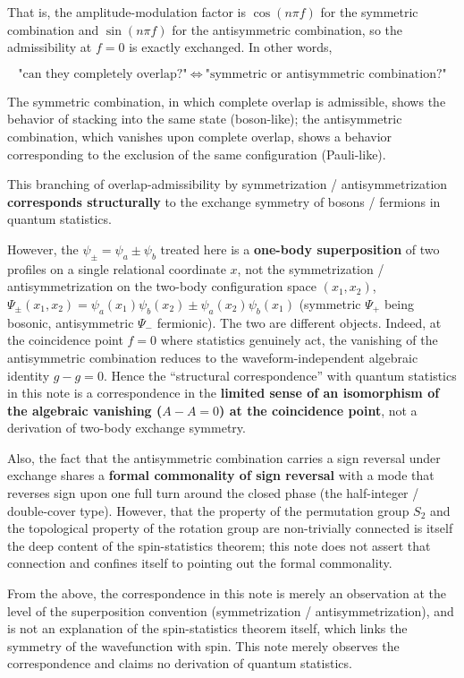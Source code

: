 \documentclass[
]{article}
\begin{document}
That is, the amplitude-modulation factor is \(\cos(n\pi f)\) for the
symmetric combination and \(\sin(n\pi f)\) for the antisymmetric
combination, so the admissibility at \(f=0\) is exactly exchanged. In
other words,

\[\text{"can they completely overlap?"}\ \Longleftrightarrow\ \text{"symmetric or antisymmetric combination?"}\]

The symmetric combination, in which complete overlap is admissible,
shows the behavior of stacking into the same state (boson-like); the
antisymmetric combination, which vanishes upon complete overlap, shows a
behavior corresponding to the exclusion of the same configuration
(Pauli-like).

This branching of overlap-admissibility by symmetrization /
antisymmetrization \textbf{corresponds structurally} to the exchange
symmetry of bosons / fermions in quantum statistics.

However, the \(\psi_\pm=\psi_a\pm\psi_b\) treated here is a
\textbf{one-body superposition} of two profiles on a single relational
coordinate \(x\), not the symmetrization / antisymmetrization on the
two-body configuration space \((x_1,x_2)\),
\(\Psi_\pm(x_1,x_2)=\psi_a(x_1)\psi_b(x_2)\pm\psi_a(x_2)\psi_b(x_1)\)
(symmetric \(\Psi_+\) being bosonic, antisymmetric \(\Psi_-\)
fermionic). The two are different objects. Indeed, at the coincidence
point \(f=0\) where statistics genuinely act, the vanishing of the
antisymmetric combination reduces to the waveform-independent algebraic
identity \(g-g=0\). Hence the ``structural correspondence'' with quantum
statistics in this note is a correspondence in the \textbf{limited sense
of an isomorphism of the algebraic vanishing (\(A-A=0\)) at the
coincidence point}, not a derivation of two-body exchange symmetry.

Also, the fact that the antisymmetric combination carries a sign
reversal under exchange shares a \textbf{formal commonality of sign
reversal} with a mode that reverses sign upon one full turn around the
closed phase (the half-integer / double-cover type). However, that the
property of the permutation group \(S_2\) and the topological property
of the rotation group are non-trivially connected is itself the deep
content of the spin-statistics theorem; this note does not assert that
connection and confines itself to pointing out the formal commonality.

From the above, the correspondence in this note is merely an observation
at the level of the superposition convention (symmetrization /
antisymmetrization), and is not an explanation of the spin-statistics
theorem itself, which links the symmetry of the wavefunction with spin.
This note merely observes the correspondence and claims no derivation of
quantum statistics.
\end{document}
